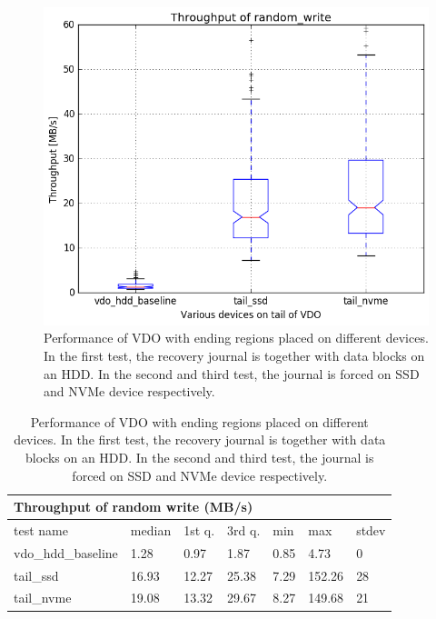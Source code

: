 \documentclass[
  color, %
  table, %
  lof,   %
  lot,   %
]{fithesis3}
\begin{document}
\begin{figure}[!htb]
        \centering
        \includegraphics[width=\textwidth]{../results/journal/report/random_write1_compare_boxplots}
\caption[Performance of VDO with ending regions placed on different devices.]{Performance of VDO with ending regions placed on different devices. In the first test, the recovery journal is together with data blocks on an HDD. In the second and third test, the journal is forced on SSD and NVMe device respectively.}
\label{fig:journal-all}
\end{figure}

\begin{table}[!htb]
\centering
\begin{tabular}{|l|l|l|l|l|l|l|}
        \hline
        \multicolumn{7}{|l|}{Throughput of random write (MB/s)} \\ \hline
        test name & median & 1st q. & 3rd q. & min & max & stdev \\ \hline 
vdo\_hdd\_baseline & 1.28 & 0.97 & 1.87 & 0.85 & 4.73 & 0 \\ \hline
tail\_ssd & 16.93 & 12.27 & 25.38 & 7.29 & 152.26 & 28 \\ \hline
tail\_nvme & 19.08 & 13.32 & 29.67 & 8.27 & 149.68 & 21 \\ \hline
\end{tabular}
\caption[Performance of VDO with the ending regions placed on different devices.]{Performance of VDO with ending regions placed on different devices. In the first test, the recovery journal is together with data blocks on an HDD. In the second and third test, the journal is forced on SSD and NVMe device respectively.}
\label{tab:journal}
\end{table}
\end{document}
